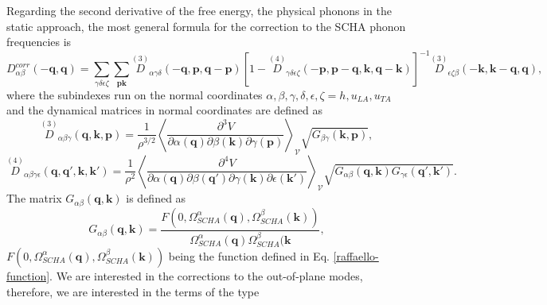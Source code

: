 Regarding the second derivative of the free energy, the physical phonons in the static approach, the most general
formula for the correction to the SCHA phonon frequencies is
\begin{equation}
 \label{correction}
 D_{\alpha\beta}^{corr}(-\boldsymbol{q},\boldsymbol{q})=\sum_{\gamma\delta\epsilon\zeta}\sum_{\boldsymbol{p}\boldsymbol{k}}\overset{(3)}{D}{}_{\alpha\gamma\delta}(-\boldsymbol{q},\boldsymbol{p},
 \boldsymbol{q}-\boldsymbol{p})[1-\overset{(4)}{D}{}_{\gamma\delta\epsilon\zeta}(-\boldsymbol{p},\boldsymbol{p}-\boldsymbol{q},\boldsymbol{k},\boldsymbol{q}-\boldsymbol{k})]^{-1}\overset{(3)}{D}{}_{
 \epsilon\zeta\beta}(-\boldsymbol{k},\boldsymbol{k}-\boldsymbol{q},\boldsymbol{q}),
\end{equation}
where the subindexes run on the normal coordinates $\alpha,\beta,\gamma,\delta,\epsilon,\zeta=h,u_{LA},u_{TA}$ and 
the dynamical matrices in normal coordinates are defined as
\begin{equation}
 \label{third-order}
 \overset{(3)}{D}{}_{\alpha\beta\gamma}(\boldsymbol{q},\boldsymbol{k},\boldsymbol{p})=\frac{1}{\rho^{3/2}}\left\langle\frac{\partial^{3}V}{\partial\alpha(\boldsymbol{q})\partial\beta(\boldsymbol{k})\partial\gamma(\boldsymbol{
 p})}\right\rangle_{\mathcal{V}}\sqrt{G_{\beta\gamma}(\boldsymbol{k},\boldsymbol{p})},
\end{equation}
\begin{equation}
 \label{fourth-order}
 \overset{(4)}{D}{}_{\alpha\beta\gamma\epsilon}(\boldsymbol{q},\boldsymbol{q}',\boldsymbol{k},\boldsymbol{k}')=\frac{1}{\rho^{2}}\left\langle\frac{\partial^{4}V}{\partial\alpha(\boldsymbol{q})\partial\beta(\boldsymbol{
 q}')\partial\gamma(\boldsymbol{k})\partial\epsilon(\boldsymbol{k}')}\right\rangle_{\mathcal{V}}\sqrt{G_{\alpha\beta}(\boldsymbol{q},\boldsymbol{k})G_{\gamma\epsilon}(\boldsymbol{q}',\boldsymbol{k}')}.
\end{equation}
The matrix $G_{\alpha\beta}(\boldsymbol{q},\boldsymbol{k})$ is defined as
\begin{equation}
 G_{\alpha\beta}(\boldsymbol{q},\boldsymbol{k})=\frac{F(0,\Omega_{SCHA}^{\alpha}(\boldsymbol{q}),\Omega_{SCHA}^{\beta}(\boldsymbol{k}))}{\Omega_{SCHA}^{\alpha}(\boldsymbol{q})\Omega_{SCHA}^{\beta}(\boldsymbol{k}},
\end{equation}
$F(0,\Omega_{SCHA}^{\alpha}(\boldsymbol{q}),\Omega_{SCHA}^{\beta}(\boldsymbol{k}))$ being the function defined in
Eq. \ref{raffaello-function}. We are interested in the corrections to the out-of-plane modes, therefore, we are
interested in the terms of the type
